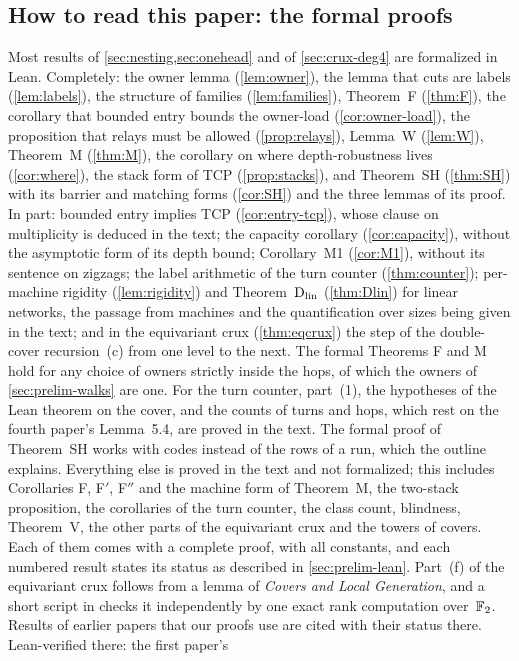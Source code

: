 \subsection{How to read this paper: the formal proofs}

Most results of \cref{sec:nesting,sec:onehead} and of \cref{sec:crux-deg4} are formalized in Lean. Completely: the owner
lemma (\cref{lem:owner}), the lemma that cuts are labels (\cref{lem:labels}), the structure of families
(\cref{lem:families}), Theorem~F (\cref{thm:F}), the corollary that bounded entry bounds the owner-load
(\cref{cor:owner-load}), the proposition that relays must be allowed (\cref{prop:relays}), Lemma~W (\cref{lem:W}),
Theorem~M (\cref{thm:M}), the corollary on where depth-robustness lives (\cref{cor:where}), the stack form of TCP
(\cref{prop:stacks}), and Theorem~SH (\cref{thm:SH}) with its barrier and matching forms (\cref{cor:SH}) and the three lemmas of
its proof. In part: bounded entry implies TCP (\cref{cor:entry-tcp}), whose clause on multiplicity is deduced in the text; the
capacity corollary (\cref{cor:capacity}), without the asymptotic form of its depth bound; Corollary~M1 (\cref{cor:M1}),
without its sentence on zigzags; the label arithmetic of the turn counter (\cref{thm:counter}); per-machine rigidity
(\cref{lem:rigidity}) and Theorem~$\mathrm{D}_{\mathrm{lin}}$ (\cref{thm:Dlin}) for linear networks, the passage from machines and the
quantification over sizes being given in the text; and in the equivariant crux (\cref{thm:eqcrux}) the step of the
double-cover recursion~(c) from one level to the next. The formal Theorems F and M hold for any choice of owners strictly
inside the hops, of which the owners of \cref{sec:prelim-walks} are one. For the turn counter, part~(1), the hypotheses of the
Lean theorem on the cover, and the counts of turns and hops, which rest on the fourth paper's Lemma~5.4, are proved in the
text. The formal proof of Theorem~SH works with codes instead of the rows of a run, which the outline explains. Everything
else is proved in the text and not formalized; this includes Corollaries F, F$'$, F$''$ and the machine form of Theorem~M, the
two-stack proposition, the corollaries of the turn counter, the class count, blindness, Theorem~V, the other parts of the
equivariant crux and the towers of covers.
Each of them comes with a complete proof, with all constants, and each numbered result states its status as described in
\cref{sec:prelim-lean}. Part~(f) of the equivariant crux follows from a lemma of \emph{Covers and Local Generation}, and a short script in
 checks it independently by one exact rank computation over~$\mathbb{F}_2$. Results of earlier papers that our proofs use are cited with their status there. Lean-verified there: the first paper's
